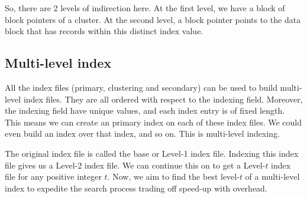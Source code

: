 \documentclass[a4paper, openany]{memoir}
\begin{document}
So, there are 2 levels of indirection here. At the first level, we have a block of block pointers of a cluster. At the second level, a block pointer points to the data block that has records within this distinct index value.



\subsection{Multi-level index}
All the index files (primary, clustering and secondary) can be used to build multi-level index files. They are all ordered with respect to the indexing field. Moreover, the indexing field have unique values, and each index entry is of fixed length. This means we can create an primary index on each of these index files. We could even build an index over that index, and so on. This is multi-level indexing.

The original index file is called the base or Level-1 index file. Indexing this index file gives us a Level-2 index file. We can continue this on to get a Level-$t$ index file for any positive integer $t$. Now, we aim to find the best level-$t$ of a multi-level index to expedite the search process trading off speed-up with overhead.
\end{document}
